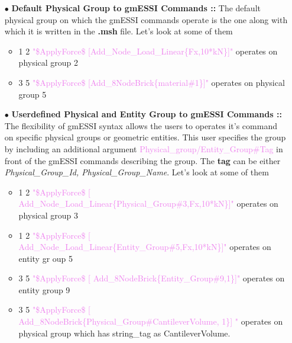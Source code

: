 \documentclass[11pt]{article}
\begin{document}
\begin{itemize}

  \item[$\bullet$]  \textbf{Default  Physical Group to gmESSI Commands ::} The
  default physical group on which the gmESSI commands operate is the one along
  with  which  it  is written in the \textbf{.msh} file. Let's look at some of
  them

  \begin{itemize}

    \item           {1           2          \textcolor{violet}{"\$ApplyForce\$
    [Add\_Node\_Load\_Linear\{Fx,10*kN\}]"} operates on physical group 2 }
    
    \item           {3           5          \textcolor{violet}{"\$ApplyForce\$
    [Add\_8NodeBrick\{material\#1\}]"} operates on physical group 5 }

  \end{itemize}

  \item[$\bullet$]  \textbf{Userdefined  Physical  and  Entity Group to gmESSI
  Commands  ::}  The flexibility of gmESSI syntax allows the users to operates
  it's  command  on  specific physical groups or geometric entities. This user
  specifies    the    group    by    including    an    additional    argument
  \textcolor{violet}{Physical_group/Entity_Group\#Tag}  in front of the gmESSI
  commands   describing   the   group.   The   \textbf{tag}   can   be  either
  \textit{Physical\_Group\_Id,  Physical\_Group\_Name}. Let's  look at some of
  them

  \begin{itemize}

    \item {1         2         \textcolor{violet}{"\$ApplyForce\$         [
    Add\_Node\_Load\_Linear\{Physical\_Group\#3,Fx,10*kN\}]"}     operates    on
   physical group 3}

    \item {1         2         \textcolor{violet}{"\$ApplyForce\$         [
    Add\_Node\_Load\_Linear\{Entity\_Group\#5,Fx,10*kN\}]"}  operates  on entity
   gr oup 5}

    \item {3         5         \textcolor{violet}{"\$ApplyForce\$         [
    Add\_8NodeBrick\{Entity\_Group\#9,1\}]"} operates on entity group 9}

    \item {3    5   \textcolor{violet}{"\$ApplyForce\$   [
    Add\_8NodeBrick\{Physical\_Group\#CantileverVolume,       1\}]       "}}   
    {operates    on    physical    group   which   has   string\_tag   as
    CantileverVolume.}  



\end{itemize}
\end{itemize}
\end{document}
